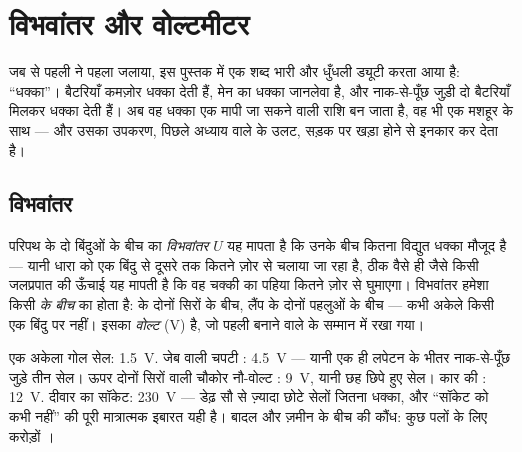 \chapter{विभवांतर और वोल्टमीटर}\label{ch:g8:voltage-voltmeter}

जब से पहली  ने पहला  जलाया, इस पुस्तक में एक शब्द भारी और
धुँधली ड्यूटी करता आया है: ``धक्का''। बैटरियाँ कमज़ोर धक्का देती हैं,
मेन का धक्का जानलेवा है, और नाक-से-पूँछ जुड़ी दो बैटरियाँ मिलकर धक्का
देती हैं। अब वह धक्का एक मापी जा सकने वाली राशि बन जाता है, वह भी एक
मशहूर  के साथ --- और उसका उपकरण, पिछले अध्याय वाले के उलट, सड़क
पर खड़ा होने से इनकार कर देता है।

\section{विभवांतर}

\begin{definition}[विभवांतर]\label{def:g8:voltage-voltmeter:voltage}
परिपथ के दो बिंदुओं के बीच का \emph{विभवांतर} $U$ यह
मापता है कि उनके बीच कितना विद्युत धक्का मौजूद है --- यानी धारा को एक
बिंदु से दूसरे तक कितने ज़ोर से चलाया जा रहा है, ठीक वैसे ही जैसे किसी
जलप्रपात की ऊँचाई यह मापती है कि वह चक्की का पहिया कितने ज़ोर से
घुमाएगा। विभवांतर हमेशा किसी \emph{के बीच} का होता है:  के दोनों
सिरों के बीच, लैंप के दोनों पहलुओं के बीच --- कभी अकेले किसी एक बिंदु
पर नहीं। इसका  \emph{वोल्ट} (\unit{V}) है, जो पहली
 बनाने वाले के सम्मान में रखा गया।
\end{definition}

\begin{example}[वोल्ट के कुनबे की तसवीरें]\label{ex:g8:voltage-voltmeter:values}
एक अकेला गोल सेल: \qty{1.5}{V}. जेब वाली चपटी : \qty{4.5}{V} ---
यानी एक ही लपेटन के भीतर नाक-से-पूँछ जुड़े तीन सेल। ऊपर दोनों सिरों
वाली चौकोर नौ-वोल्ट : \qty{9}{V}, यानी छह छिपे हुए सेल। कार की
: \qty{12}{V}. दीवार का सॉकेट: \qty{230}{V} --- डेढ़ सौ से
ज़्यादा छोटे सेलों जितना धक्का, और ``सॉकेट को कभी नहीं'' की पूरी
मात्रात्मक इबारत यही है। बादल और ज़मीन के बीच की कौंध: कुछ पलों के लिए
करोड़ों ।
\end{example}

